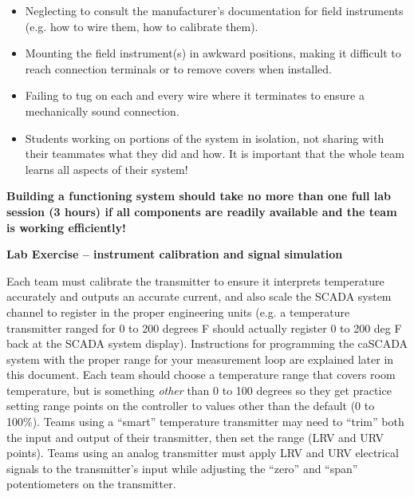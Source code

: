 \documentclass[12pt,a4paper]{article}
\begin{document}
\begin{itemize}
\begin{itemize}
\item{} Neglecting to consult the manufacturer's documentation for field instruments (e.g. how to wire them, how to calibrate them).
\item{} Mounting the field instrument(s) in awkward positions, making it difficult to reach connection terminals or to remove covers when installed.
\item{} Failing to tug on each and every wire where it terminates to ensure a mechanically sound connection.
\item{} Students working on portions of the system in isolation, not sharing with their teammates what they did and how.  It is important that the whole team learns all aspects of their system!
\end{itemize}

\vskip 10pt

{\bf Building a functioning system should take no more than one full lab session (3 hours) if all components are readily available and the team is working efficiently!}







\vfil \eject

\noindent
{\bf Lab Exercise -- instrument calibration and signal simulation}

\vskip 5pt

Each team must calibrate the transmitter to ensure it interprets temperature accurately and outputs an accurate current, and also scale the SCADA system channel to register in the proper engineering units (e.g. a temperature transmitter ranged for 0 to 200 degrees F should actually register 0 to 200 deg F back at the SCADA system display).  Instructions for programming the caSCADA system with the proper range for your measurement loop are explained later in this document.  Each team should choose a temperature range that covers room temperature, but is something {\it other} than 0 to 100 degrees so they get practice setting range points on the controller to values other than the default (0 to 100\%).  Teams using a ``smart'' temperature transmitter may need to ``trim'' both the input and output of their transmitter, then set the range (LRV and URV points).  Teams using an analog transmitter must apply LRV and URV electrical signals to the transmitter's input while adjusting the ``zero'' and ``span'' potentiometers on the transmitter.


\end{itemize}
\end{document}
